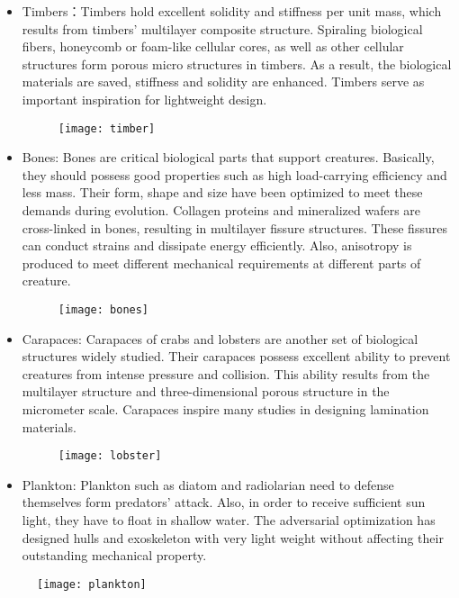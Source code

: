 \begin{itemize}
\item Timbers：Timbers hold excellent solidity and stiffness per unit mass, which results from timbers' multilayer composite structure. Spiraling biological fibers, honeycomb or foam-like cellular cores, as well as other cellular structures form porous micro structures in timbers. As a result, the biological materials are saved, stiffness and solidity are enhanced. Timbers serve as important inspiration for lightweight design\cite{ma2008elastic}.

\begin{figure}
	\centering
	\texttt{[image: timber]}
	\label{fig:1}
\end{figure}

\item Bones: Bones are critical biological parts that support creatures. Basically, they should possess good properties such as high load-carrying efficiency and less mass. Their form, shape and size have been optimized to meet these demands during evolution. Collagen proteins and mineralized wafers are cross-linked in bones, resulting in multilayer fissure structures. These fissures can conduct strains and dissipate energy efficiently. Also, anisotropy is produced to meet different mechanical requirements at different parts of creature.

\begin{figure}
	\centering
	\texttt{[image: bones]}
	\label{fig:2}
\end{figure}

\item Carapaces: Carapaces of crabs and lobsters are another set of biological structures widely studied. Their carapaces possess excellent ability to prevent creatures from intense pressure and collision. This ability results from the multilayer structure and three-dimensional porous structure in the micrometer scale. Carapaces inspire many studies in designing lamination materials.

\begin{figure}
	\centering
	\texttt{[image: lobster]}
	\label{fig:3}
\end{figure}

\item Plankton: Plankton such as diatom and radiolarian need to defense themselves form predators' attack. Also, in order to receive sufficient sun light, they have to float in shallow water. The adversarial optimization has designed hulls and exoskeleton with very light weight without affecting their outstanding mechanical property. \\
\end{itemize}
\begin{figure}
	\centering
	\texttt{[image: plankton]}
	\label{fig:3}
\end{figure}

